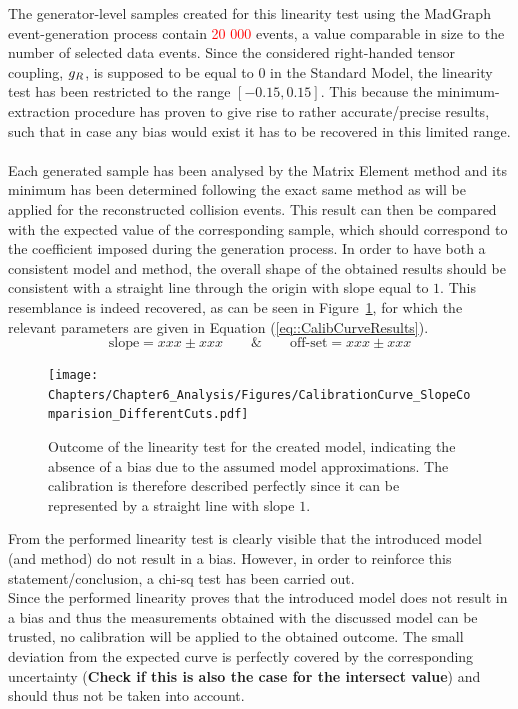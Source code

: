 The generator-level samples created for this linearity test using the MadGraph event-generation process contain \textcolor{red}{20 000} events, a value comparable in size to the number of selected data events. 
Since the considered right-handed tensor coupling, $g_{R}$, is supposed to be equal to $0$ in the Standard Model, the linearity test has been restricted to the range $\left[-0.15, 0.15\right]$.
This because the minimum-extraction procedure has proven to give rise to rather accurate/precise results, such that in case any bias would exist it has to be recovered in this limited range.
\\
\\
Each generated sample has been analysed by the Matrix Element method and its minimum has been determined following the exact same method as will be applied for the reconstructed collision events.
This result can then be compared with the expected value of the corresponding sample, which should correspond to the coefficient imposed during the generation process.
In order to have both a consistent model and method, the overall shape of the obtained results should be consistent with a straight line through the origin with slope equal to $1$.
This resemblance is indeed recovered, as can be seen in Figure~\ref{fig::CalibCurve}, for which the relevant parameters are given in Equation (\ref{eq::CalibCurveResults}).
\begin{equation} \label{eq::CalibCurveResults}
 \textrm{slope} = xxx \pm xxx \qquad \& \qquad \textrm{off-set} = xxx \pm xxx  
\end{equation}

\begin{figure}[h!t]
 \centering
 \texttt{[image: Chapters/Chapter6\_Analysis/Figures/CalibrationCurve\_SlopeComparision\_DifferentCuts.pdf]}
 \caption{Outcome of the linearity test for the created model, indicating the absence of a bias due to the assumed model approximations. The calibration is therefore described perfectly since it can be represented by a straight line with slope $1$.} \label{fig::CalibCurve}
\end{figure}

From the performed linearity test is clearly visible that the introduced model (and method) do not result in a bias.
However, in order to reinforce this statement/conclusion, a chi-sq test has been carried out.
\\
Since the performed linearity proves that the introduced model does not result in a bias and thus the measurements obtained with the discussed model can be trusted, no calibration will be applied to the obtained outcome. The small deviation from the expected curve is perfectly covered by the corresponding uncertainty (\textbf{Check if this is also the case for the intersect value}) and should thus not be taken into account.
\\

